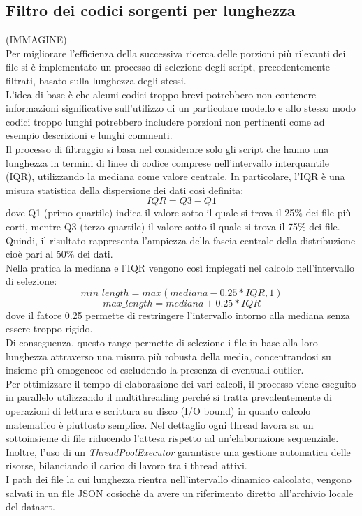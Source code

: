 \documentclass{article}
\begin{document}
\subsection{Filtro dei codici sorgenti per lunghezza}
(IMMAGINE)\\
Per migliorare l'efficienza della successiva ricerca delle porzioni più rilevanti dei file si è implementato un processo di selezione degli script, precedentemente filtrati, basato sulla lunghezza degli stessi.\\
L'idea di base è che alcuni codici troppo brevi potrebbero non contenere informazioni significative sull'utilizzo di un particolare modello e allo stesso modo codici troppo lunghi potrebbero includere porzioni non pertinenti come ad esempio descrizioni e lunghi commenti.\\
Il processo di filtraggio si basa nel considerare solo gli script che hanno una lunghezza in termini di linee di codice comprese nell'intervallo interquantile (IQR), utilizzando la mediana come valore centrale. In particolare, l'IQR è una misura statistica della dispersione dei dati così definita:
\begin{equation}
    IQR = Q3 - Q1
\end{equation}
dove Q1 (primo quartile) indica il valore sotto il quale si trova il 25\% dei file più corti, mentre Q3 (terzo quartile) il valore sotto il quale si trova il 75\% dei file. Quindi, il risultato rappresenta l'ampiezza della fascia centrale della distribuzione cioè pari al 50\% dei dati.\\
Nella pratica la mediana e l'IQR vengono così impiegati nel calcolo nell'intervallo di selezione:
\begin{equation}
    min\_length =max(mediana-0.25*IQR,1)
\end{equation}
\begin{equation}
    max\_length =mediana+0.25*IQR
\end{equation}
dove il fatore 0.25 permette di restringere l'intervallo intorno alla mediana senza essere troppo rigido.\\
Di conseguenza, questo range permette di selezione i file in base alla loro lunghezza attraverso una misura più robusta della media, concentrandosi su insieme più omogeneoe ed escludendo la presenza di eventuali outlier.\\
Per ottimizzare il tempo di elaborazione dei vari calcoli, il processo viene eseguito in parallelo utilizzando il multithreading perché si tratta prevalentemente di operazioni di lettura e scrittura su disco (I/O bound) in quanto calcolo matematico è piuttosto semplice. Nel dettaglio ogni thread lavora su un sottoinsieme di file riducendo l'attesa rispetto ad un'elaborazione sequenziale. Inoltre, l'uso di un \textit{ThreadPoolExecutor}\cite{python-concurrent-futures} garantisce una gestione automatica delle risorse, bilanciando il carico di lavoro tra i thread attivi.\\
I path dei file la cui lunghezza rientra nell'intervallo dinamico calcolato, vengono salvati in un file JSON cosicchè da avere un riferimento diretto all'archivio locale del dataset.
\end{document}
